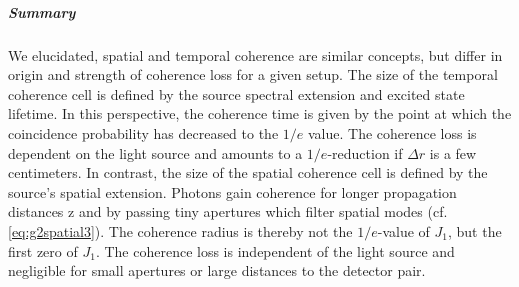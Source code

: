 \subparagraph{Summary} We elucidated, spatial and temporal coherence are similar concepts, but differ in origin and strength of coherence loss for a given setup. The size of the temporal coherence cell is defined by the source spectral extension and excited state lifetime. In this perspective, the coherence time is given by the point at which the coincidence probability has decreased to the $1/e$ value. The coherence loss is dependent on the light source and amounts to a $1/e$-reduction if $\Delta r$ is a few centimeters.
In contrast, the size of the spatial coherence cell is defined by the source's spatial extension. Photons gain coherence for longer propagation distances z and by passing tiny apertures which filter spatial modes (cf. \cref{eq:g2spatial3}). The coherence radius is thereby not the $1/e$-value of $J_1$, but the first zero of $J_1$. The coherence loss is independent of the light source and negligible for small apertures or large distances to the detector pair.

